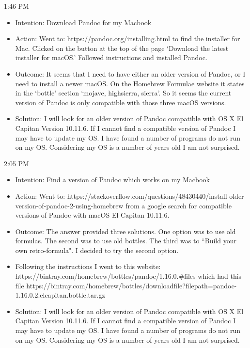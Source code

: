 \documentclass{article}
\begin{document}
1:46 PM
\begin{itemize}
    \item Intention: Download Pandoc for my Macbook
    \item Action: Went to: https://pandoc.org/installing.html to find the installer for Mac. Clicked on the button at the top of the page `Download the latest installer for macOS.' Followed instructions and installed Pandoc. 
    \item Outcome: It seems that I need to have either an older version of Pandoc, or I need to install a newer macOS. On the Homebrew Formulae website it states in the `bottle' section `mojave, high\textunderscore sierra, sierra'. So it seems the current version of Pandoc is only compatible with those three macOS versions.
    \item Solution: I will look for an older version of Pandoc compatible with OS X El Capitan Version 10.11.6. If I cannot find a compatible version of Pandoc I may have to update my OS. I have found a number of programs do not run on my OS. Considering my OS is a number of years old I am not surprised.
\end{itemize}

2:05 PM

\begin{itemize}
    \item Intention: Find a version of Pandoc which works on my Macbook
    \item Action: Went to: https://stackoverflow.com/questions/48430440/install-older-version-of-pandoc-2-using-homebrew from a google search for compatible versions of Pandoc with macOS El Capitan 10.11.6.
    \item Outcome: The answer provided three solutions. One option was to use old formulas. The second was to use old bottles. The third was to ``Build your own retro-formula". I decided to try the second option.
    \item Following the instructions I went to this website: https://bintray.com/homebrew/bottles/pandoc/1.16.0.\#files which had this file https://bintray.com/homebrew/bottles/download\textunderscore  file?file\textunderscore path=pandoc-1.16.0\-.2.el\textunderscore capitan.bottle.tar.gz
    \item Solution: I will look for an older version of Pandoc compatible with OS X El Capitan Version 10.11.6. If I cannot find a compatible version of Pandoc I may have to update my OS. I have found a number of programs do not run on my OS. Considering my OS is a number of years old I am not surprised.
\end{itemize}
\end{document}
